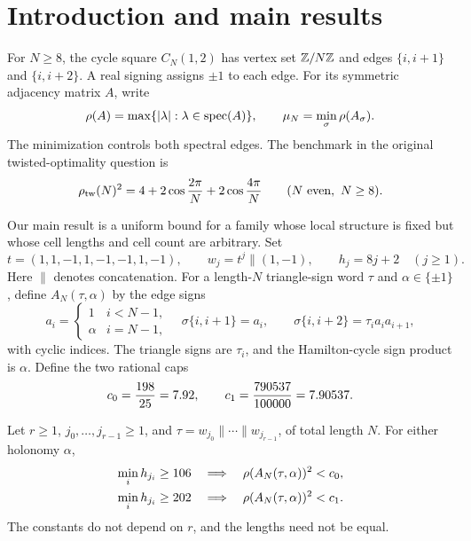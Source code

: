 \section{Introduction and main results}

For $N\ge8$, the cycle square $C_N(1,2)$ has vertex set $\mathbb Z/N\mathbb Z$ and
edges $\{i,i+1\}$ and $\{i,i+2\}$. A real signing assigns $\pm1$ to each
edge. For its symmetric adjacency matrix $A$, write
\[
 \rho(A)=\max\{|\lambda|:\lambda\in\operatorname{spec}(A)\},
 \qquad \mu_N=\min_\sigma\rho(A_\sigma).
\]
The minimization controls both spectral edges. The benchmark in the
original twisted-optimality question \cite{Suvagiya2026old} is
\begin{equation}
 \rho_{\mathrm{tw}}(N)^2=4+2\cos\frac{2\pi}{N}+2\cos\frac{4\pi}{N}
 \qquad(N\text{ even},\ N\ge8).
 \label{eq:twisted}
\end{equation}

Our main result is a uniform bound for a family whose local structure is
fixed but whose cell lengths and cell count are arbitrary. Set
\begin{equation}
 t=(1,1,-1,1,-1,-1,1,-1),\qquad
 w_j=t^j\mathbin{\|}(1,-1),\qquad h_j=8j+2\quad(j\ge1).
 \label{eq:word}
\end{equation}
Here $\|$ denotes concatenation. For a length-$N$ triangle-sign word
$\tau$ and $\alpha\in\{\pm1\}$, define $A_N(\tau,\alpha)$ by the edge signs
\begin{equation}
 a_i=\begin{cases}1&i<N-1,\\\alpha&i=N-1,\end{cases}
 \quad
 \sigma\{i,i+1\}=a_i,\qquad
 \sigma\{i,i+2\}=\tau_i a_i a_{i+1},
 \label{eq:gauge-definition}
\end{equation}
with cyclic indices. The triangle signs are $\tau_i$, and the
Hamilton-cycle sign product is $\alpha$.
Define the two rational caps
\[
 c_0=\frac{198}{25}=7.92,\qquad
 c_1=\frac{790537}{100000}=7.90537.
\]

\begin{theorem}\label{thm:cells}
Let $r\ge1$, $j_0,\ldots,j_{r-1}\ge1$, and
$\tau=w_{j_0}\|\cdots\|w_{j_{r-1}}$, of total length $N$.
For either holonomy $\alpha$,
\begin{align}
 \min_i h_{j_i}\ge106&\quad\Longrightarrow\quad
       \rho(A_N(\tau,\alpha))^2<c_0,\label{eq:cell-cap0}\\
 \min_i h_{j_i}\ge202&\quad\Longrightarrow\quad
       \rho(A_N(\tau,\alpha))^2<c_1.\label{eq:cell-cap1}
\end{align}
The constants do not depend on $r$, and the lengths need not be equal.
\end{theorem}

